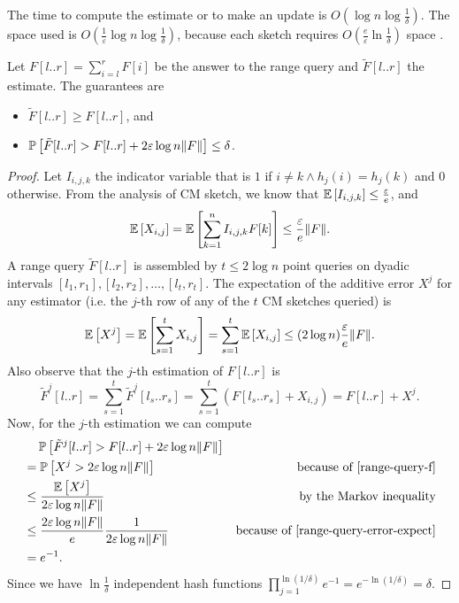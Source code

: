 The time to compute the estimate or to make an update is $O(\log n\log\frac{1}{\delta})$. The space used is $O(\frac{1}{\varepsilon}\log n\log\frac{1}{\delta})$, because each sketch requires $O(\frac{e}{\varepsilon}\ln\frac{1}{\delta})$ space \cite{Cormode05}.

Let $F[l..r]=\sum_{i=l}^rF[i]$ be the answer to the range query and $\tilde{F}[l..r]$ the estimate. The guarantees are
\begin{itemize}
  \item $\tilde{F}[l..r] \geq F[l..r]$, and
  \item $\operatorname*{\mathbb{P}}\left[{\tilde{F}[l..r] > F[l..r]+2\varepsilon\log n\lVert F\rVert}\right] \leq \delta$.
\end{itemize}

\begin{proof}
  Let $I_{i,j,k}$ the indicator variable that is $1$ if $i \ne k \wedge h_j(i)=h_j(k)$ and $0$ otherwise. From the analysis of CM sketch, we know that
  $\mathbb{E}\left[{I_{i,j,k}}\right] \leq \frac{\varepsilon}{e}$,
  and
  $$\mathbb{E}\left[{X_{i,j}}\right] = \mathbb{E}\left[{\sum_{k=1}^n I_{i,j,k}F[k]}\right] \leq \frac{\varepsilon}{e}\lVert F\rVert.$$
  A range query $\tilde{F}[l..r]$ is assembled by  $t \leq 2\log n$ point queries on dyadic intervals $[l_1,r_1], [l_2,r_2], \dots, [l_t,r_t]$. 
  The expectation of the additive error $X^j$ for any estimator (i.e. the $j$-th row of any of the $t$ CM sketches queried) is
  \begin{equation}
    \mathbb{E}\left[{X^j}\right] = \mathbb{E}\left[{\sum_{s=1}^tX_{i,j}}\right]=\sum_{s=1}^t\mathbb{E}\left[{X_{i,j}}\right] \leq (2\log n) \frac{\varepsilon}{e}\lVert F\rVert.
    \label{range-query-error-expect}
  \end{equation}
  Also observe that the $j$-th estimation of $F[l..r]$ is
  \begin{equation}
    \tilde{F}^j[l..r]= \sum_{s=1}^t \tilde{F}^j[l_s..r_s] = \sum_{s=1}^t (F[l_s..r_s] + X_{i,j}) = F[l..r]+X^j.
    \label{range-query-f}
  \end{equation}
  Now, for the $j$-th estimation we can compute
  \begin{align*}
    &\phantom{={}} \prob{\tilde{F}^j[l..r] > F[l..r]+2\varepsilon\log n\norm{F}} & \\
    &= \prob{X^j > 2\varepsilon\log n\norm{F}} & \text{because of \eqref{range-query-f}} \\
    &\leq \frac{\E{X^j}}{2\varepsilon\log n\norm{F}} & \text{by the Markov inequality} \\
    &\leq  \frac{2\varepsilon\log n\norm{F}}{e} \frac{1}{2\varepsilon\log n\norm{F}} & \text{because of \eqref{range-query-error-expect}} \\
    &= e^{-1}. &
  \end{align*}
  Since we have $\ln\frac{1}{\delta}$ independent hash functions $\prod_{j=1}^{\ln(1/\delta)}e^{-1}=e^{-\ln(1/\delta)}=\delta$.
\end{proof}

